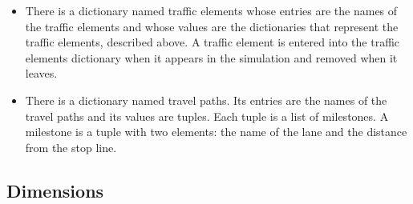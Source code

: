 \documentclass[letterpaper,twoside]{article}
\begin{document}
\begin{itemize}
\begin{itemize}
{  This is implemented by increasing Current Position in the List of Milestones
  by 1 and fetching the next milestone.  If there is none the traffic
  element vanishes.}
\item{Desired speed is the speed at which the traffic element will travel if
  it is unconstrained.}
\item{Current speed is the speed the traffic elememt is actually moving towards
  its next milestone.  This will be the desired speed unless something
  limits its speed:}
  \begin{itemize}
  \item{The speed limit of the road.  Lanes 1, 2, B, C, 4, 5, F, and G are
    limited to 45 miles per hour.  Lanes A, 3, D, E, 6, H, and J are limited
    to 25 miles per hour.  Pedestrian crossings are limited to walking speed:
    3.5 feet per second.}
  \item{If there is a vehicle just ahead of this one, this vehicle
    is limited to the speed of that vehicle.}
  \item{If this traffic element is 0 distance from the intersection on lanes
    A, ps, B, C, D, E, pn, F, G, H, or J and the corresponding signal face
    is red, the speed of this traffic element is 0.}
  \end{itemize}
\item{Length is the length of the vehicle.  If any part of the vehicle
  overlaps any part of a sensor, the sensor is triggered.  Advance sensors
  are 6 feet long; stop-line sensors are 20 feet long.  Sensors have
  positions and lengths.}
\end{itemize}

\item{There is a dictionary named traffic elements whose entries
are the names of the traffic elements and whose values are the dictionaries
that represent the traffic elements, described above.
A traffic element is entered into the traffic elements dictionary
when it appears in the simulation and removed when it leaves.}

\item{There is a dictionary named travel paths.  Its entries are the
  names of the travel paths and its values are tuples.  Each tuple
  is a list of milestones.  A milestone is a tuple with two elements:
  the name of the lane and the distance from the stop line.}
\end{itemize}

\subsection{Dimensions}
\end{document}
